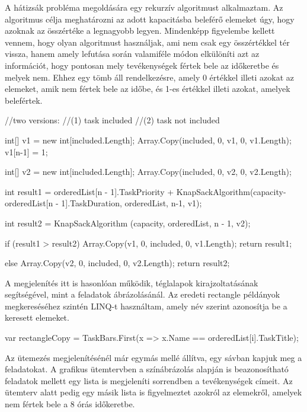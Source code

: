 
A hátizsák probléma megoldására egy rekurzív algoritmust alkalmaztam. Az algoritmus célja meghatározni az adott kapacitásba beleférő elemeket úgy, hogy  azoknak az összértéke a legnagyobb legyen. Mindenképp figyelembe kellett vennem, hogy olyan algoritmust használjak, ami nem csak egy összértékkel tér vissza, hanem amely lefutása során valamiféle módon elkülöníti azt az információt, hogy pontosan mely tevékenységek fértek bele az időkeretbe és melyek nem. Ehhez egy tömb áll rendelkezésre, amely 0 értékkel illeti azokat az elemeket, amik nem fértek bele az időbe, és 1-es értékkel illeti azokat, amelyek belefértek.

\begin{java}
//two versions:
//(1) task included
//(2) task not included

int[] v1 = new int[included.Length];
Array.Copy(included, 0, v1, 0, v1.Length);
v1[n-1] = 1;
	
int[] v2 = new int[included.Length];
Array.Copy(included, 0, v2, 0, v2.Length);
	
int result1 = orderedList[n - 1].TaskPriority
+ KnapSackAlgorithm(capacity-orderedList[n - 1].TaskDuration,
orderedList, n-1, v1);
	
int result2 = KnapSackAlgorithm
(capacity, orderedList, n - 1, v2);
	
if (result1 > result2)
{
	Array.Copy(v1, 0, included, 0, v1.Length);
	return result1;
}
	
else
{
	Array.Copy(v2, 0, included, 0, v2.Length);
	return result2;
}
\end{java}


A megjelenítés itt is hasonlóan működik, téglalapok kirajzoltatásának segítségével, mint a feladatok ábrázolásánál. Az eredeti rectangle példányok megkereséséhez szintén LINQ-t használtam, amely név szerint azonosítja be a keresett elemeket.

\begin{java}
var rectangleCopy =
TaskBars.First(x => x.Name == orderedList[i].TaskTitle);
\end{java}


Az ütemezés megjelenítésénél már egymás mellé állítva, egy sávban kapjuk meg a feladatokat. A grafikus ütemtervben a színábrázolás alapján is beazonosítható feladatok mellett egy lista is megjeleníti sorrendben a tevékenységek címeit. Az ütemterv alatt pedig egy másik lista is figyelmeztet azokról az elemekről, amelyek nem fértek bele a 8 órás időkeretbe.


